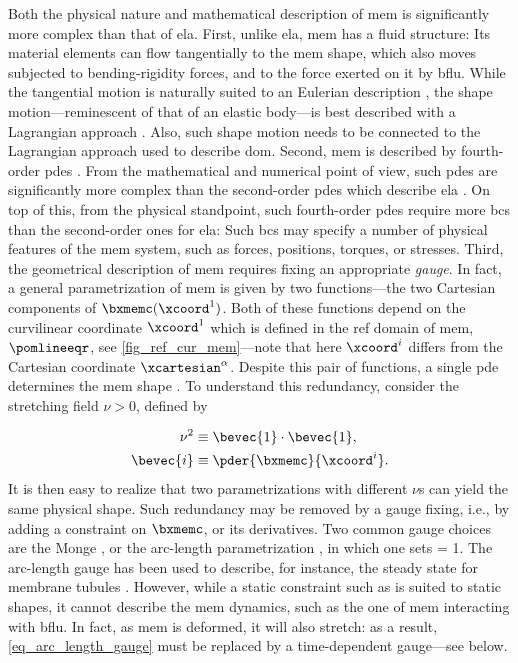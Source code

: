 Both the physical nature and mathematical description of \ac{mem} is significantly more complex than that of \ac{ela}. First, unlike \ac{ela}, \ac{mem} has a fluid structure: Its material elements can  flow tangentially to the \ac{mem} shape, which also moves subjected to  bending-rigidity forces, and to the force exerted on it by \ac{bflu}.
While the tangential motion is naturally suited to an Eulerian description \cite{landauFluidMechanics1987}, the shape motion---reminescent of that of an elastic body---is best described with a Lagrangian approach \cite{lacarbonaraNonlinearStructuralMechanics2013}.
Also, such shape motion needs to be connected to the Lagrangian approach used to describe \ac{dom}. Second, \ac{mem} is described by fourth-order \acp{pde} \cite{zhong-canBendingEnergyVesicle1989}. From  the mathematical and numerical point of view, such \acp{pde} are significantly more complex than the second-order \acp{pde} which describe \ac{ela} \cite{worthmullerIRENEFluIdLayeR2025}. On top of this, from the physical standpoint, such fourth-order \acp{pde} require more  \acp{bc} than the second-order ones for \ac{ela}: Such \acp{bc} may specify a number of physical features of the \ac{mem} system, such as forces, positions, torques, or stresses.
Third, the geometrical description of \ac{mem} requires fixing an appropriate \textit{gauge}.
In fact, a general parametrization of \ac{mem} is given by two functions---the two Cartesian components of $\bxmemc(\xcoord^1)$. Both of these functions  depend on the curvilinear coordinate $\xcoord^1$ which is defined in the \ac{ref} domain of \ac{mem}, $\pomlineeqr$, see \cref{fig_ref_cur_mem}---note that here $\xcoord^i$ differs from the Cartesian coordinate $\xcartesian^\alpha$.
Despite this pair of functions, a single \ac{pde}  determines the \ac{mem} shape \cite{zhong-canBendingEnergyVesicle1989}.
To understand this redundancy, consider the  stretching field $\nu>0$, defined by

\begin{align}\label{eq_intro_nu}
        \nu ^ 2   & \equiv \bevec{1}   \cdot \bevec{1}, \\
        \label{eq_def_e}
        \bevec{i} & \equiv \pder{{\bxmemc}}{\xcoord^i}.
\end{align}
It is then easy to realize that two  parametrizations with different $\nu$s can yield the same physical shape. Such  redundancy  may be removed by a gauge fixing, i.e., by adding a constraint on $\bxmemc$, or its derivatives.
Two common gauge choices are the Monge  \cite{hsiungFirstCourseDifferential1981,desernoFluidLipidMembranes2015}, or the arc-length parametrization \cite{derenyiFormationInteractionMembrane2002}, in which one sets
\be
\label{eq_arc_length_gauge}
\nu = 1.
\ee
The arc-length gauge has been used to describe, for instance, the steady state for membrane tubules \cite{derenyiFormationInteractionMembrane2002}. However, while a static constraint such as  is suited to  static shapes, it cannot describe the  \ac{mem} dynamics, such as the one of \ac{mem} interacting with \ac{bflu}. In fact, as \ac{mem} is deformed, it will also stretch: as a result, \cref{eq_arc_length_gauge} must be replaced by a time-dependent  gauge---see below.

